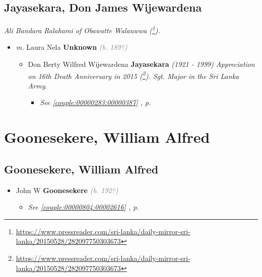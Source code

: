 \documentclass[10pt, openany]{book}
\begin{document}
\chapter{Jayasekara, Don James Wijewardena}
\label{00002610}
\textcolor{slmaroon}{\textit{Ali Bandara Ralahami of Obawatte Walauwwa (\footnote{\url{https://www.pressreader.com/sri-lanka/daily-mirror-sri-lanka/20150528/282097750303673}}).}}
\begin{itemize}
\item{\textit{m.} Laura Nela \textbf{Unknown} \textcolor{gray}{\textit{(b. 189?)}}   \label{couple:00002610:00002611} \begin{itemize}
\item{Don Berty Wilfred Wijewardena \textbf{Jayasekara} \textcolor{slorange}{\textit{(1921 - 1999)}} \textcolor{slmaroon}{\textit{Appreciation on 16th Death Anniversary in 2015 (\footnote{\url{https://www.pressreader.com/sri-lanka/daily-mirror-sri-lanka/20150528/282097750303673}}).
Sgt. Major in the Sri Lanka Army.}}
\begin{itemize}
\item{\textcolor{slteal}{\textit{See  \autoref{couple:00000283:00000387} \textit{, p. \pageref{couple:00000283:00000387} }}}}
\end{itemize}
    }
\end{itemize}}
\end{itemize}
   
\part{Goonesekere, William Alfred}
\chapter{Goonesekere, William Alfred}
\label{00002617}
\textcolor{slmaroon}{\textit{}}
\begin{itemize}
\item{John W \textbf{Goonesekere} \textcolor{gray}{\textit{(b. 192?)}}
\begin{itemize}
\item{\textcolor{slteal}{\textit{See  \autoref{couple:00000804:00002616} \textit{, p. \pageref{couple:00000804:00002616} }}}}
\end{itemize}
  }
\end{itemize}
  
\end{document}
